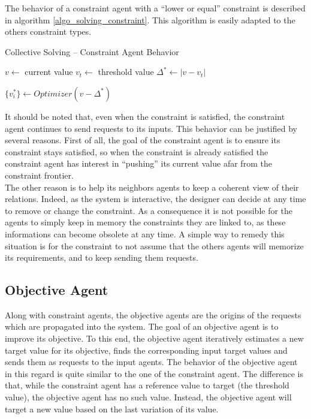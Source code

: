 The behavior of a constraint agent with a \enquote{lower or equal} constraint is described in algorithm \ref{algo_solving_constraint}. This algorithm is easily adapted to the others constraint types.

\begin{algorithm}
\caption{Collective Solving -- Constraint Agent Behavior}
\label{algo_solving_constraint}

$v \leftarrow $ current value\;
$v_t \leftarrow $ threshold value\;
$\Delta^* \leftarrow |v - v_t|$\;

\BlankLine
$\{v_i^* \} \leftarrow Optimizer(v - \Delta^*)$\;
\end{algorithm}

It should be noted that, even when the constraint is satisfied, the constraint agent continues to send requests to its inputs. This behavior can be justified by several reasons. First of all, the goal of the constraint agent is to ensure its constraint stays satisfied, so when the constraint is already satisfied the constraint agent has interest in \enquote{pushing} its current value afar from the constraint frontier.\\
The other reason is to help its neighbors agents to keep a coherent view of their relations. Indeed, as the system is interactive, the designer can decide at any time to remove or change the constraint. As a consequence it is not possible for the agents to simply keep in memory the constraints they are linked to, as these informations can become obsolete at any time. A simple way to remedy this situation is for the constraint to not assume that the others agents will memorize its requirements, and to keep sending them requests.

\subsection{Objective Agent}

Along with constraint agents, the objective agents are the origins of the requests which are propagated into the system. The goal of an objective agent is to improve its objective. To this end, the objective agent iteratively estimates a new target value for its objective, finds the corresponding input target values and sends them as requests to the input agents. The behavior of the objective agent in this regard is quite similar to the one of the constraint agent. The difference is that, while the constraint agent has a reference value to target (the threshold value), the objective agent has no such value. Instead, the objective agent will target a new value based on the last variation of its value.

